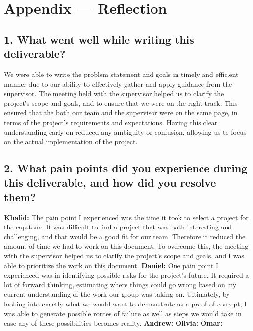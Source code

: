 \documentclass{article}
\begin{document}
\section*{Appendix --- Reflection}

\iffalse
\wss{Not required for CAS 741}
\fi



\subsection*{1. What went well while writing this deliverable?}
We were able to write the problem statement and goals in timely and efficient manner due to our ability to effectively gather and apply guidance from the supervisor. The meeting held with the supervisor helped us to clarify the project's scope and goals, and to ensure that we were on the right track. This ensured that the both our team and the supervisor were on the same page, in terms of the project's requirements and expectations. Having this clear understanding early on reduced any ambiguity or confusion, allowing us to focus on the actual implementation of the project.

\subsection*{2. What pain points did you experience during this deliverable, and how did you resolve them?}
\bigskip
\textbf{Khalid:} The pain point I experienced was the time it took to select a project for the capstone. It was difficult to find a project that was both interesting and challenging, and that would be a good fit for our team. Therefore it reduced the amount of time we had to work on this document. To overcome this, the meeting with the supervisor helped us to clarify the project's scope and goals, and I was able to prioritize the work on this document.
\newline
\newline
\textbf{Daniel:} One pain point I experienced was in identifying possible risks for the project's future. It required a lot of forward thinking, estimating where things could go wrong based on my current understanding of the work our group was taking on. Ultimately, by looking into exactly what we would want to demonstrate as a proof of concept, I was able to generate possible routes of failure as well as steps we would take in case any of these possibilities becomes reality.
\newline
\newline
\textbf{Andrew:}
\newline
\newline
\textbf{Olivia:}
\newline
\newline
\textbf{Omar:}
\end{document}
